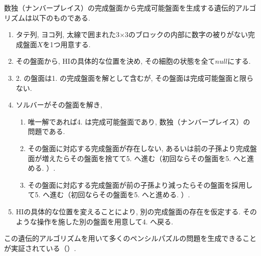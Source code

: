 \begin{example}[遺伝的アルゴリズム]
  数独（ナンバープレイス）の完成盤面から完成可能盤面を生成する遺伝的アルゴリズムは以下のものである.
  \begin{enumerate}
    \item タテ列, ヨコ列, 太線で囲まれた3$\times$3のブロックの内部に数字の被りがない完成盤面$X$を1つ用意する.
    \item その盤面から, HIの具体的な位置を決め, その細胞の状態を全て$null$にする.
    \item 2. の盤面は1. の完成盤面を解として含むが, その盤面は完成可能盤面と限らない.
    \item ソルバーがその盤面を解き,
          \begin{enumerate}
            \item 唯一解であれば4. は完成可能盤面であり, 数独（ナンバープレイス）の問題である.
            \item その盤面に対応する完成盤面が存在しない, あるいは前の子孫より完成盤面が増えたらその盤面を捨てて5. へ進む（初回ならその盤面を5. へと進める. ）.
            \item その盤面に対応する完成盤面が前の子孫より減ったらその盤面を採用して5. へ進む（初回ならその盤面を5. へと進める. ）.
          \end{enumerate}
    \item HIの具体的な位置を変えることにより, 別の完成盤面の存在を仮定する. そのような操作を施した別の盤面を用意して4. へ戻る.
  \end{enumerate}
\end{example}

この遺伝的アルゴリズムを用いて多くのペンシルパズルの問題を生成できることが実証されている（\cite{Fujiwara2022}）.
